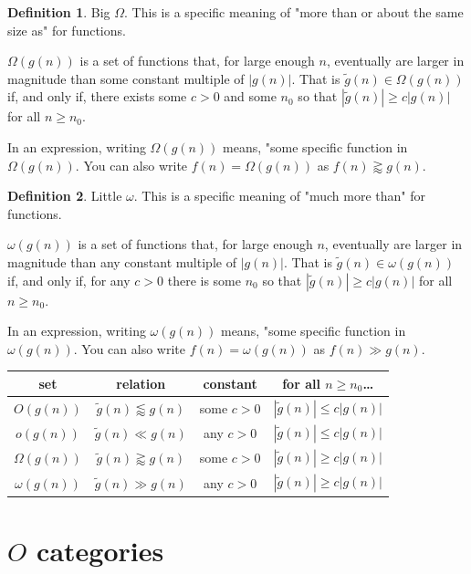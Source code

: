 \documentclass{tufte-handout}
\theoremstyle{definition}
\newtheorem{definition}{Definition}
\theoremstyle{example}
\theoremstyle{theorem}
\begin{document}
\begin{definition}{Big $\Omega$}. This is a specific meaning of "more than or about the same size as" for functions.

$\Omega(g(n))$ is a set of functions that, for large enough $n$, eventually are larger in magnitude than some constant multiple of $|g(n)|$.  That is $\tilde{g}(n) \in \Omega(g(n))$ if, and only if, there exists some $c>0$ and some $n_0$ so that $|\tilde{g}(n)| \geq c |g(n)|$ for all $n \geq n_0$.  
\end{definition}

In an expression, writing $\Omega(g(n))$ means, "some specific function in $\Omega(g(n))$.  You can also write $f(n)=\Omega(g(n))$ as $f(n) \gtrapprox g(n)$.

\begin{definition}{Little $\omega$}. This is a specific meaning of "much more than" for functions.

$\omega(g(n))$ is a set of functions that, for large enough $n$, eventually are larger in magnitude than any constant multiple of $|g(n)|$.  That is $\tilde{g}(n) \in \omega(g(n))$ if, and only if, for any $c>0$ there is some $n_0$ so that $|\tilde{g}(n)| \geq c |g(n)|$ for all $n \geq n_0$.  
\end{definition}

In an expression, writing $\omega(g(n))$ means, "some specific function in $\omega(g(n))$.  You can also write $f(n)=\omega(g(n))$ as $f(n) \gg g(n)$.


\begin{tabular}{|c|c|c|c|}
\hline
set & relation & constant & for all $n \geq n_0$\ldots \\
\hline
    $O(g(n))$  &  $\tilde{g}(n) \lessapprox g(n)$ & some $c>0$ & $|\tilde{g}(n)| \leq c |g(n)|$ \\
    $o(g(n))$  &  $\tilde{g}(n) \ll g(n)$ & any $c>0$ & $|\tilde{g}(n)| \leq c |g(n)|$ \\
    $\Omega(g(n))$  &  $\tilde{g}(n) \gtrapprox g(n)$ & some $c>0$ & $|\tilde{g}(n)| \geq c |g(n)|$ \\
    $\omega(g(n))$  &  $\tilde{g}(n) \gg g(n)$ & any $c>0$ & $|\tilde{g}(n)| \geq c |g(n)|$ \\
    \hline
\end{tabular}

\section{$O$ categories}
\end{document}
